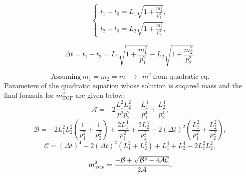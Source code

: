\begin{equation}
 \left\{\begin{array}{l}%
 t_{1}-t_{0} = L_{1}\sqrt{1+\frac{m_{1}^{2}}{p_{1}^{2}}}, \\[3pt]
 t_{2}-t_{0} = L_{2}\sqrt{1+\frac{m_{2}^{2}}{p_{2}^{2}}},
\end{array}\right.%
\end{equation}

\begin{equation}
 \Delta t = t_{1}-t_{2} = L_{1}\sqrt{1+\frac{m_{1}^{2}}{p_{1}^{2}}} - L_{2}\sqrt{1+\frac{m_{2}^{2}}{p_{2}^{2}}}.
\end{equation}

\[\text{Assuming}~m_{1}=m_{2}=m~~\rightarrow~~m^{2}~\text{from quadratic eq.}\]
Parameters of the quadratic equation whose solution is suqared mass and the final formula for $m^{2}_{\text{TOF}}$ are given below:
\begin{equation}
\mathcal{A}= -2\frac{L^2_1L^2_2}{p^2_1p^2_2}+\frac{L^4_1}{p^4_1}+\frac{L^4_2}{p^4_2},
\end{equation}
\begin{equation}
\mathcal{B}=-2L^2_1L^2_2\left({\frac{1}{p^2_1}} + {\frac{1}{p^2_2}}\right)+\frac{2L^4_1}{p_1^2}+\frac{2L^4_2}{p_2^2}-2\left(\Delta t\right)^2\left(\frac{L^2_1}{p_1^2}+\frac{L^2_2}{p_2^2}\right),
\end{equation}
\begin{equation}
\mathcal{C}=\left(\Delta t\right)^4-2\left(\Delta t\right)^2\left(L^2_1+L^2_2\right)+L^4_1+L^4_2-2L^2_1L^2_2,
\end{equation}
\begin{equation}
 \label{eq:mSquared}
m^{2}_{\text{\tiny TOF}} = \frac{-\mathcal{B}+\sqrt{\mathcal{B}^2-4\mathcal{A}\mathcal{C}}}{2\mathcal{A}}.
\end{equation}






